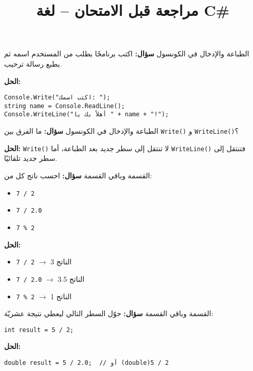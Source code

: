\documentclass[12pt]{beamer}
\title{مراجعة قبل الامتحان – لغة C\#}
\author{}
\date{}
\begin{document}
\begin{frame}
  \titlepage
\end{frame}

\begin{frame}[fragile]{الطباعة والإدخال في الكونسول}
\textbf{سؤال:}
اكتب برنامجًا يطلب من المستخدم اسمه ثم يطبع رسالة ترحيب.

\pause
\textbf{الحل:}
\begin{lstlisting}[language={[Sharp]C}]
Console.Write("اكتب اسمك: ");
string name = Console.ReadLine();
Console.WriteLine("أهلاً بك يا " + name + "!");
\end{lstlisting}
\end{frame}

\begin{frame}{الطباعة والإدخال في الكونسول}
\textbf{سؤال:}
ما الفرق بين \texttt{Write()} و \texttt{WriteLine()}؟

\pause
\textbf{الحل:}
\texttt{Write()} لا تنتقل إلى سطر جديد بعد الطباعة،
أما \texttt{WriteLine()} فتنتقل إلى سطر جديد تلقائيًا.
\end{frame}

\begin{frame}{القسمة وباقي القسمة}
\textbf{سؤال:}
احسب ناتج كل من:
\begin{itemize}
  \item \texttt{7 / 2}
  \item \texttt{7 / 2.0}
  \item \texttt{7 \% 2}
\end{itemize}

\pause
\textbf{الحل:}
\begin{itemize}
  \item \texttt{7 / 2} $\rightarrow$ الناتج 3
  \item \texttt{7 / 2.0} $\rightarrow$ الناتج 3.5
  \item \texttt{7 \% 2} $\rightarrow$ الناتج 1
\end{itemize}
\end{frame}

\begin{frame}[fragile]{القسمة وباقي القسمة}
\textbf{سؤال:}
حوّل السطر التالي ليعطي نتيجة عشريّة:
\begin{lstlisting}[language={[Sharp]C}]
int result = 5 / 2;
\end{lstlisting}

\pause
\textbf{الحل:}
\begin{lstlisting}[language={[Sharp]C}]
double result = 5 / 2.0;  // أو (double)5 / 2
\end{lstlisting}
\end{frame}
\end{document}
